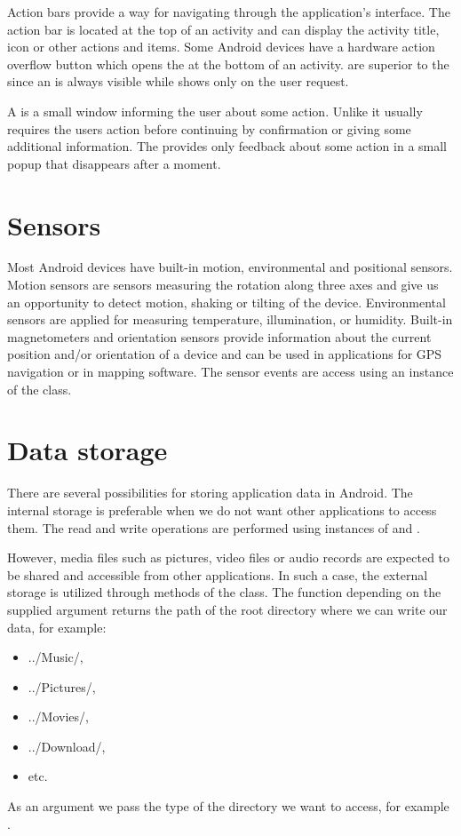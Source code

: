Action bars provide a way for navigating through the application's interface. %
The action bar is located at the top of an activity and can display the activity title, icon or other actions and items.
Some Android devices have a hardware action overflow button which opens the  at the bottom of an activity. %
 are superior to the  since an  is always visible while  shows only on the user request.

A  is a small window informing the user about some action. 
Unlike  it usually requires the users action before continuing by confirmation or giving some additional information.
The  provides only feedback about some action in a small popup that disappears after a moment.

\section{Sensors}

Most Android devices have built-in motion, environmental and positional sensors.
Motion sensors are sensors measuring the rotation along three axes and give us an opportunity to detect motion, shaking or tilting of the device. 
Environmental sensors are applied for measuring temperature, illumination, or humidity.
Built-in magnetometers and orientation sensors provide information about the current position and/or orientation of a device and can be used in applications for GPS navigation or in mapping software. 
The sensor events are access using an instance of the  class.

\section{Data storage}

There are several possibilities for storing application data in Android. 
The internal storage is preferable when we do not want other applications to access them. 
The read and write operations are performed using instances of  and .

However, media files such as pictures, video files or audio records are expected to be shared and accessible from other applications.
In such a case, the external storage is utilized through methods of the  class.
The function  depending on the supplied argument returns the path of the root directory where we can write our data, for example: 
\begin{itemize}
\item{../Music/,}
\item{../Pictures/,}
\item{../Movies/,}
\item{../Download/,}
\item{etc.}
\end{itemize}
As an argument we pass the type of the directory we want to access, for example .


